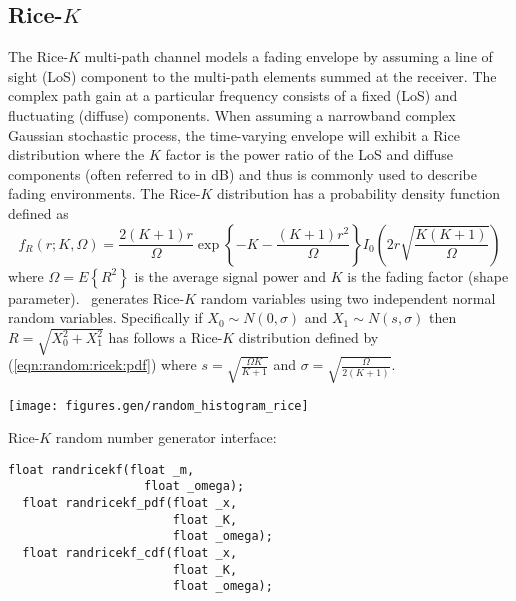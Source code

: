 %
%
\subsection{Rice-$K$}
\label{module:random:ricek}
The Rice-$K$ multi-path
channel models a fading envelope by assuming a line of sight (LoS)
component to the multi-path elements summed at the receiver.
The complex path gain at a particular frequency consists of a fixed
(LoS) and fluctuating (diffuse) components.
When assuming a narrowband complex Gaussian stochastic process, the
time-varying envelope will exhibit a Rice distribution where the $K$
factor is the power ratio of the LoS and diffuse components (often
referred to in dB) and thus is commonly used to describe fading
environments.
%
The Rice-$K$ distribution has a probability density function defined as
%
\begin{equation}
\label{eqn:random:ricek:pdf}
    f_R(r;K,\Omega) = 
        \frac{2(K+1)r}{\Omega}
        \exp\left\{-K-\frac{(K+1)r^2}{\Omega}\right\}
        I_0\left( 2r\sqrt{\frac{K(K+1)}{\Omega}} \right)
\end{equation}
%
where $\Omega=E\left\{R^2\right\}$ is the average signal power and $K$
is the fading factor (shape parameter).
\liquid\ generates Rice-$K$ random variables using two independent
normal random variables.
Specifically if
$X_0 \sim N(0,\sigma)$
and
$X_1 \sim N(s,\sigma)$
then
$R = \sqrt{X_0^2 + X_1^2}$
has follows a Rice-$K$ distribution defined by
(\ref{eqn:random:ricek:pdf})
where
$s      = \sqrt{\frac{\Omega K}{K+1}}$
and
$\sigma = \sqrt{\frac{\Omega}{2(K+1)}}$.


\begin{minipage}{0.5\textwidth}
  \texttt{[image: figures.gen/random\_histogram\_rice]}
\end{minipage}
\begin{minipage}{0.5\textwidth}
  Rice-$K$ random number generator interface:
  \begin{Verbatim}[fontsize=\small]
  float randricekf(float _m,
                   float _omega);
  float randricekf_pdf(float _x,
                       float _K,
                       float _omega);
  float randricekf_cdf(float _x,
                       float _K,
                       float _omega);
  \end{Verbatim}
\end{minipage}


% 
%
